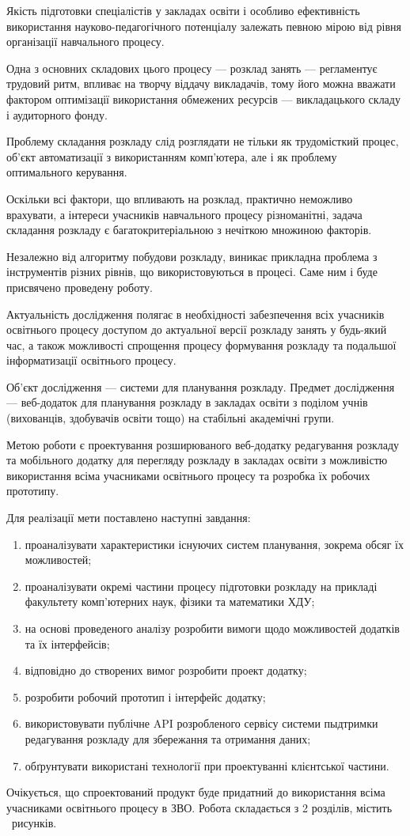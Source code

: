 
Якість підготовки спеціалістів у закладах освіти і особливо ефективність використання науково-педагогічного потенціалу залежать певною мірою від рівня організації навчального процесу.

Одна з основних складових цього процесу — розклад занять — регламентує трудовий ритм, впливає на творчу віддачу викладачів, тому його можна вважати фактором оптимізації використання обмежених ресурсів — викладацького складу і аудиторного фонду.

Проблему складання розкладу слід розглядати не тільки як трудомісткий процес, об'єкт автоматизації з використанням комп’ютера, але і як проблему оптимального керування. 

Оскільки всі фактори, що впливають на розклад, практично неможливо врахувати, а інтереси учасників навчального процесу різноманітні, задача складання розкладу є багатокритеріальною з нечіткою множиною факторів.

Незалежно від алгоритму побудови розкладу, виникає прикладна проблема з інструментів різних рівнів, що використовуються в процесі. Саме ним і буде присвячено проведену роботу.

Актуальність дослідження полягає в необхідності забезпечення всіх учасників освітнього процесу доступом до актуальної версії розкладу занять у будь-який час, а також можливості спрощення процесу формування розкладу та подальшої інформатизації освітнього процесу.

Об’єкт дослідження — системи для планування розкладу. Предмет дослідження —  веб-додаток для планування розкладу в закладах освіти з поділом учнів (вихованців, здобувачів освіти тощо) на стабільні академічні групи.

Метою роботи є проектування розширюваного веб-додатку редагування розкладу та мобільного додатку для перегляду розкладу в закладах освіти з можливістю використання всіма учасниками освітнього процесу та розробка їх робочих прототипу.

Для реалізації мети поставлено наступні завдання:
\begin{enumerate}
	\item проаналізувати характеристики існуючих систем планування, зокрема обсяг їх можливостей;
	\item проаналізувати окремі частини процесу підготовки розкладу на прикладі факультету комп’ютерних наук, фізики та математики ХДУ;
	\item на основі проведеного аналізу розробити вимоги щодо можливостей додатків та їх інтерфейсів;
	\item відповідно до створених вимог розробити проект додатку;
	\item розробити робочий прототип і інтерфейс додатку;
	\item використовувати публічне API розробленого сервісу системи пыдтримки редагування розкладу для збережання та отримання даних;
	\item обґрунтувати використані технології при проектуванні клієнтської частини.
\end{enumerate}

Очікується, що спроектований продукт буде придатний до використання всіма учасниками освітнього процесу в ЗВО.
Робота складається з 2 розділів, містить \totalfigures\ рисунків.
